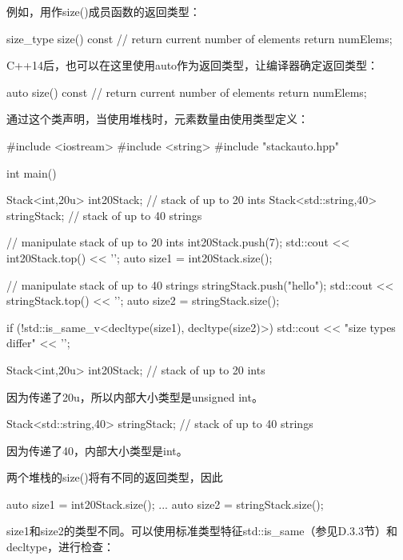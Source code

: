 例如，用作size()成员函数的返回类型：

\begin{cpp}
size_type size() const { // return current number of elements
	return numElems;
}
\end{cpp}

C++14后，也可以在这里使用auto作为返回类型，让编译器确定返回类型：

\begin{cpp}
auto size() const { // return current number of elements
	return numElems;
}
\end{cpp}

通过这个类声明，当使用堆栈时，元素数量由使用类型定义：

\begin{cpp}
#include <iostream>
#include <string>
#include "stackauto.hpp"

int main() {
	Stack<int,20u> int20Stack; // stack of up to 20 ints
	Stack<std::string,40> stringStack; // stack of up to 40 strings
	
	// manipulate stack of up to 20 ints
	int20Stack.push(7);
	std::cout << int20Stack.top() << '\n';
	auto size1 = int20Stack.size();
	
	// manipulate stack of up to 40 strings
	stringStack.push("hello");
	std::cout << stringStack.top() << '\n';
	auto size2 = stringStack.size();
	
	if (!std::is_same_v<decltype(size1), decltype(size2)>) {
		std::cout << "size types differ" << '\n';
	}
}
\end{cpp}


\begin{cpp}
Stack<int,20u> int20Stack; // stack of up to 20 ints
\end{cpp}

因为传递了20u，所以内部大小类型是unsigned int。

\begin{cpp}
Stack<std::string,40> stringStack; // stack of up to 40 strings
\end{cpp}

因为传递了40，内部大小类型是int。

两个堆栈的size()将有不同的返回类型，因此

\begin{cpp}
auto size1 = int20Stack.size();
...
auto size2 = stringStack.size();
\end{cpp}

size1和size2的类型不同。可以使用标准类型特征std::is\_same（参见D.3.3节）和decltype，进行检查：

